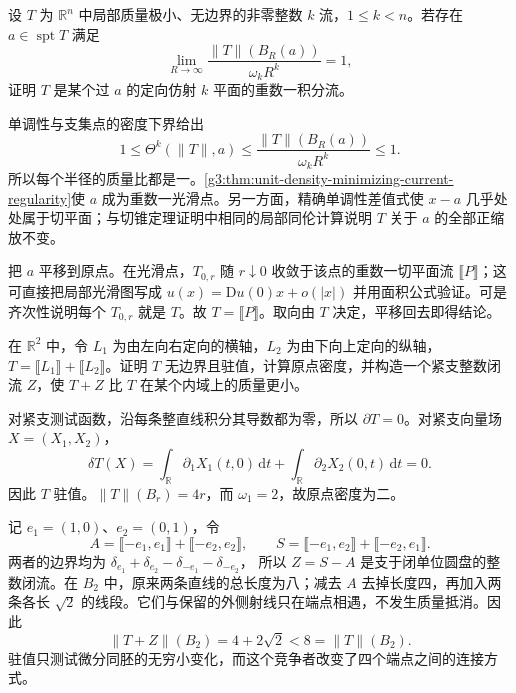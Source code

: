 \begin{exercise}\label{g3:ex:unit-growth-entire-current}
	设 \(T\) 为 \(\mathbb R^n\) 中局部质量极小、无边界的非零整数 \(k\) 流，\(1\le k<n\)。若存在 \(a\in\operatorname{spt}T\) 满足
	\[
		\lim_{R\to\infty}\frac{\|T\|(B_R(a))}{\omega_kR^k}=1,
	\]
	证明 \(T\) 是某个过 \(a\) 的定向仿射 \(k\) 平面的重数一积分流。
\end{exercise}
\begin{solution}
	单调性与支集点的密度下界给出
	\[
		1\le\Theta^k(\|T\|,a)
		\le\frac{\|T\|(B_R(a))}{\omega_kR^k}\le1.
	\]
	所以每个半径的质量比都是一。\cref{g3:thm:unit-density-minimizing-current-regularity}使 \(a\) 成为重数一光滑点。另一方面，精确单调性差值式使 \(x-a\) 几乎处处属于切平面；与切锥定理证明中相同的局部同伦计算说明 \(T\) 关于 \(a\) 的全部正缩放不变。

	把 \(a\) 平移到原点。在光滑点，\(T_{0,r}\) 随 \(r\downarrow0\) 收敛于该点的重数一切平面流 \(\lBrack P\rBrack\)；这可直接把局部光滑图写成 \(u(x)=\mathrm Du(0)x+o(|x|)\) 并用面积公式验证。可是齐次性说明每个 \(T_{0,r}\) 就是 \(T\)。故 \(T=\lBrack P\rBrack\)。取向由 \(T\) 决定，平移回去即得结论。
\end{solution}

\begin{exercise}\label{g3:ex:crossing-stationary-not-minimizing}
	在 \(\mathbb R^2\) 中，令 \(L_1\) 为由左向右定向的横轴，\(L_2\) 为由下向上定向的纵轴，\(T=\lBrack L_1\rBrack+\lBrack L_2\rBrack\)。证明 \(T\) 无边界且驻值，计算原点密度，并构造一个紧支整数闭流 \(Z\)，使 \(T+Z\) 比 \(T\) 在某个内域上的质量更小。
\end{exercise}
\begin{solution}
	对紧支测试函数，沿每条整直线积分其导数都为零，所以 \(\partial T=0\)。对紧支向量场 \(X=(X_1,X_2)\)，
	\[
		\delta T(X)=\int_{\mathbb R}\partial_1X_1(t,0)\,\mathrm dt
		+\int_{\mathbb R}\partial_2X_2(0,t)\,\mathrm dt=0.
	\]
	因此 \(T\) 驻值。\(\|T\|(B_r)=4r\)，而 \(\omega_1=2\)，故原点密度为二。

	记 \(e_1=(1,0)\)、\(e_2=(0,1)\)，令
	\[
		A=\lBrack-e_1,e_1\rBrack+\lBrack-e_2,e_2\rBrack,
		\qquad
		S=\lBrack-e_1,e_2\rBrack+\lBrack-e_2,e_1\rBrack.
	\]
	两者的边界均为
	\(\delta_{e_1}+\delta_{e_2}-\delta_{-e_1}-\delta_{-e_2}\)，
	所以 \(Z=S-A\) 是支于闭单位圆盘的整数闭流。在 \(B_2\) 中，原来两条直线的总长度为八；减去 \(A\) 去掉长度四，再加入两条各长 \(\sqrt2\) 的线段。它们与保留的外侧射线只在端点相遇，不发生质量抵消。因此
	\[
		\|T+Z\|(B_2)=4+2\sqrt2<8=\|T\|(B_2).
	\]
	驻值只测试微分同胚的无穷小变化，而这个竞争者改变了四个端点之间的连接方式。
\end{solution}

